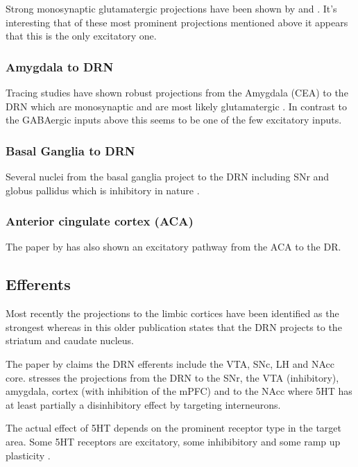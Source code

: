 \documentclass[12pt,a4paper]{article}
\begin{document}
Strong monosynaptic glutamatergic projections have been shown by \citep{Lee2003} and \citep{Aghajanian1990}. It's interesting that of these most prominent projections mentioned above it appears that this is the only excitatory one.

\subsubsection{Amygdala to DRN}

Tracing studies have shown robust projections from the Amygdala (CEA) to the DRN \citep{PollakDorocic2014} which are monosynaptic and are most likely glutamatergic \citep{Swanson1998}. In contrast to the GABAergic inputs above this seems to be one of the few excitatory inputs.

\subsubsection{Basal Ganglia to DRN}

Several nuclei from the basal ganglia project to the DRN including SNr and globus pallidus which is inhibitory in nature \citep{PollakDorocic2014}.

\subsubsection{Anterior cingulate cortex (ACA)}

The paper by  \citep{PollakDorocic2014} has also shown an excitatory pathway from the ACA to the DR.

\subsection{Efferents}

Most recently the projections to the limbic cortices have been identified as the strongest \citep{Linley2013} \citep{Roberts2011} whereas in this older publication \citep{Reisine1984} states that the DRN projects to the striatum and caudate nucleus. 

The paper by \citep{Vertes2010} claims the DRN efferents include the VTA, SNc, LH and NAcc core. \citep{Nakamura2013} stresses the projections from the DRN to the SNr, the VTA (inhibitory), amygdala, cortex (with inhibition of the mPFC) and to the NAcc where 5HT has at least partially a disinhibitory effect by targeting interneurons.

The actual effect of 5HT depends on the prominent receptor type in the target area. Some 5HT receptors are excitatory, some inhibibitory and some ramp up plasticity \citep{Frazer1999}.
\end{document}
